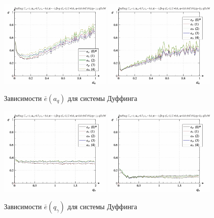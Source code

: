 \begin{figure}[ht!]
\begin{center}
  \includegraphics[width=0.49\textwidth]{p/cha/duff/duff_id-p_a_q_sign.png}
  \hfill
  \includegraphics[width=0.49\textwidth]{p/cha/duff/duff_id-p_a_q_sin.png}
\end{center}
  \caption{Зависимости $\bar{e}(a_q)$ для системы Дуффинга}
\label{atu:f:duff_e_a_q}
\end{figure}


\begin{figure}[ht!]
\begin{center}
  \includegraphics[width=0.49\textwidth]{p/cha/duff/duff_id-p_q_gamma_sign.png}
  \hfill
  \includegraphics[width=0.49\textwidth]{p/cha/duff/duff_id-p_q_gamma_sin.png}
\end{center}
  \caption{Зависимости $\bar{e}(q_\gamma)$ для системы Дуффинга}
\label{atu:f:duff_e_q_gamma}
\end{figure}

